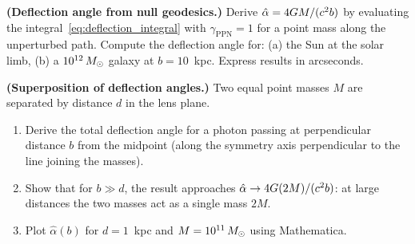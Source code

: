 \begin{exercise}
\label{ex:deflection_angle_derivation}
\textbf{(Deflection angle from null geodesics.)}
Derive $\hat{\alpha} = 4GM/(c^2 b)$ by evaluating the
integral~\eqref{eq:deflection_integral} with $\gamma_{\mathrm{PPN}} = 1$
for a point mass along the unperturbed path.  Compute the deflection angle for:
(a) the Sun at the solar limb,
(b) a $10^{12}\,M_{\odot}$ galaxy at $b = 10$~kpc.
Express results in arcseconds.
\end{exercise}

\begin{exercise}
\label{ex:superposition_prob}
\textbf{(Superposition of deflection angles.)}
Two equal point masses $M$ are separated by distance $d$ in the lens
plane.
\begin{enumerate}[label=(\alph*)]
    \item Derive the total deflection angle for a photon passing at
          perpendicular distance $b$ from the midpoint (along the
          symmetry axis perpendicular to the line joining the masses).
    \item Show that for $b \gg d$, the result approaches
          $\hat{\alpha} \to 4G(2M)/(c^2 b)$: at large distances the two
          masses act as a single mass $2M$.
    \item Plot $\hat{\alpha}(b)$ for $d = 1$~kpc and
          $M = 10^{11}\,M_{\odot}$ using Mathematica.
\end{enumerate}
\end{exercise}
